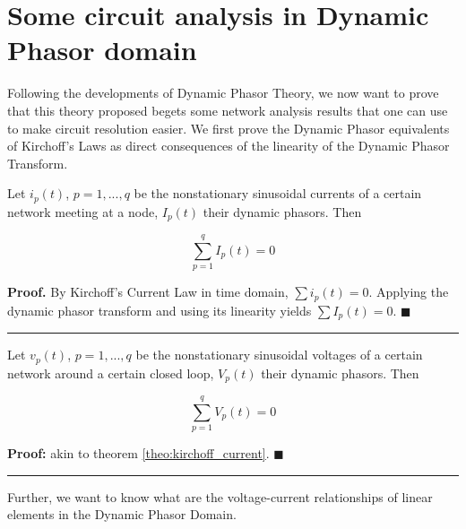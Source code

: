 \section{Some circuit analysis in Dynamic Phasor domain} %

	Following the developments of Dynamic Phasor Theory, we now want to prove that this theory proposed begets some network analysis results that one can use to make circuit resolution easier. We first prove the Dynamic Phasor equivalents of Kirchoff's Laws as direct consequences of the linearity of the Dynamic Phasor Transform.

\begin{theorem} \label{theo:kirchoff_current_1p} %
Let $i_p(t)$, $p = 1,...,q$ be the nonstationary sinusoidal currents of a certain network meeting at a node, $I_p(t)$ their dynamic phasors. Then

\begin{equation} \sum\limits_{p=1}^q I_p(t) = 0 \end{equation}

\end{theorem}
\textbf{Proof.} By Kirchoff's Current Law in time domain, $\sum i_p(t) = 0$. Applying the dynamic phasor transform and using its linearity yields $\sum I_p(t) = 0$. \hfill$\blacksquare$ 
\vspace{5mm}
\hrule
\vspace{5mm} %
	
\begin{theorem} \label{theo:kirchoff_voltage_1p} %
Let $v_p(t)$, $p = 1,...,q$ be the nonstationary sinusoidal voltages of a certain network around a certain closed loop, $V_p(t)$ their dynamic phasors. Then

\begin{equation} \sum\limits_{p=1}^q V_p(t) = 0 \end{equation}

\end{theorem}
\textbf{Proof:} akin to theorem \ref{theo:kirchoff_current}. \hfill$\blacksquare$
\vspace{5mm}
\hrule
\vspace{5mm} %

	Further, we want to know what are the voltage-current relationships of linear elements in the Dynamic Phasor Domain.

